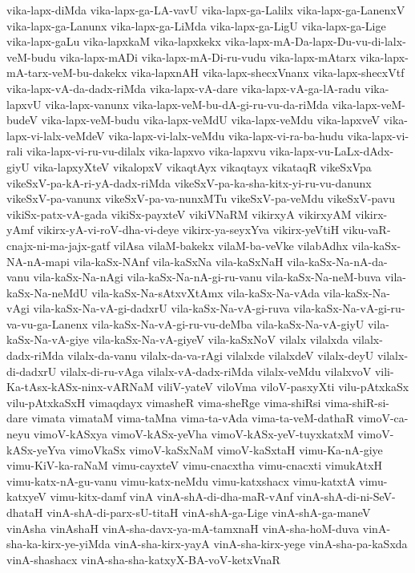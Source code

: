 {vika-lapx-diMda
vika-lapx-ga-LA-vavU
vika-lapx-ga-Lalilx
vika-lapx-ga-LanenxV
vika-lapx-ga-Lanunx
vika-lapx-ga-LiMda
vika-lapx-ga-LigU
vika-lapx-ga-Lige
vika-lapx-gaLu
vika-lapxkaM
vika-lapxkekx
vika-lapx-mA-Da-lapx-Du-vu-di-lalx-veM-budu
vika-lapx-mADi
vika-lapx-mA-Di-ru-vudu
vika-lapx-mAtarx
vika-lapx-mA-tarx-veM-bu-dakekx
vika-lapxnAH
vika-lapx-shecxVnanx
vika-lapx-shecxVtf
vika-lapx-vA-da-dadx-riMda
vika-lapx-vA-dare
vika-lapx-vA-ga-lA-radu
vika-lapxvU
vika-lapx-vanunx
vika-lapx-veM-bu-dA-gi-ru-vu-da-riMda
vika-lapx-veM-budeV
vika-lapx-veM-budu
vika-lapx-veMdU
vika-lapx-veMdu
vika-lapxveV
vika-lapx-vi-lalx-veMdeV
vika-lapx-vi-lalx-veMdu
vika-lapx-vi-ra-ba-hudu
vika-lapx-vi-rali
vika-lapx-vi-ru-vu-dilalx
vika-lapxvo
vika-lapxvu
vika-lapx-vu-LaLx-dAdx-giyU
vika-lapxyXteV
vikalopxV
vikaqtAyx
vikaqtayx
vikataqR
vikeSxVpa
vikeSxV-pa-kA-ri-yA-dadx-riMda
vikeSxV-pa-ka-sha-kitx-yi-ru-vu-danunx
vikeSxV-pa-vanunx
vikeSxV-pa-va-nunxMTu
vikeSxV-pa-veMdu
vikeSxV-pavu
vikiSx-patx-vA-gada
vikiSx-payxteV
vikiVNaRM
vikirxyA
vikirxyAM
vikirx-yAmf
vikirx-yA-vi-roV-dha-vi-deye
vikirx-ya-seyxYva
vikirx-yeVtiH
viku-vaR-cnajx-ni-ma-jajx-gatf
vilAsa
vilaM-bakekx
vilaM-ba-veVke
vilabAdhx
vila-kaSx-NA-nA-mapi
vila-kaSx-NAnf
vila-kaSxNa
vila-kaSxNaH
vila-kaSx-Na-nA-da-vanu
vila-kaSx-Na-nAgi
vila-kaSx-Na-nA-gi-ru-vanu
vila-kaSx-Na-neM-buva
vila-kaSx-Na-neMdU
vila-kaSx-Na-sAtxvXtAmx
vila-kaSx-Na-vAda
vila-kaSx-Na-vAgi
vila-kaSx-Na-vA-gi-dadxrU
vila-kaSx-Na-vA-gi-ruva
vila-kaSx-Na-vA-gi-ru-va-vu-ga-Lanenx
vila-kaSx-Na-vA-gi-ru-vu-deMba
vila-kaSx-Na-vA-giyU
vila-kaSx-Na-vA-giye
vila-kaSx-Na-vA-giyeV
vila-kaSxNoV
vilalx
vilalxda
vilalx-dadx-riMda
vilalx-da-vanu
vilalx-da-va-rAgi
vilalxde
vilalxdeV
vilalx-deyU
vilalx-di-dadxrU
vilalx-di-ru-vAga
vilalx-vA-dadx-riMda
vilalx-veMdu
vilalxvoV
vili-Ka-tAsx-kASx-ninx-vARNaM
viliV-yateV
viloVma
viloV-pasxyXti
vilu-pAtxkaSx
vilu-pAtxkaSxH
vimaqdayx
vimasheR
vima-sheRge
vima-shiRsi
vima-shiR-si-dare
vimata
vimataM
vima-taMna
vima-ta-vAda
vima-ta-veM-dathaR
vimoV-ca-neyu
vimoV-kASxya
vimoV-kASx-yeVha
vimoV-kASx-yeV-tuyxkatxM
vimoV-kASx-yeYva
vimoVkaSx
vimoV-kaSxNaM
vimoV-kaSxtaH
vimu-Ka-nA-giye
vimu-KiV-ka-raNaM
vimu-cayxteV
vimu-cnacxtha
vimu-cnacxti
vimukAtxH
vimu-katx-nA-gu-vanu
vimu-katx-neMdu
vimu-katxshacx
vimu-katxtA
vimu-katxyeV
vimu-kitx-damf
vinA
vinA-shA-di-dha-maR-vAnf
vinA-shA-di-ni-SeV-dhataH
vinA-shA-di-parx-sU-titaH
vinA-shA-ga-Lige
vinA-shA-ga-maneV
vinAsha
vinAshaH
vinA-sha-davx-ya-mA-tamxnaH
vinA-sha-hoM-duva
vinA-sha-ka-kirx-ye-yiMda
vinA-sha-kirx-yayA
vinA-sha-kirx-yege
vinA-sha-pa-kaSxda
vinA-shashacx
vinA-sha-sha-katxyX-BA-voV-ketxVnaR
}
